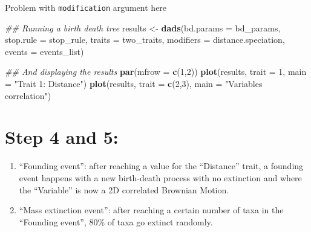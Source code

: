 \documentclass[]{book}
\newenvironment{Shaded}{\begin{snugshade}}{\end{snugshade}}
\newcommand{\CommentTok}[1]{\textcolor[rgb]{0.56,0.35,0.01}{\textit{#1}}}
\newcommand{\DataTypeTok}[1]{\textcolor[rgb]{0.13,0.29,0.53}{#1}}
\newcommand{\DecValTok}[1]{\textcolor[rgb]{0.00,0.00,0.81}{#1}}
\newcommand{\KeywordTok}[1]{\textcolor[rgb]{0.13,0.29,0.53}{\textbf{#1}}}
\newcommand{\NormalTok}[1]{#1}
\newcommand{\StringTok}[1]{\textcolor[rgb]{0.31,0.60,0.02}{#1}}
\providecommand{\tightlist}{%
  \setlength{\itemsep}{0pt}\setlength{\parskip}{0pt}}
\begin{document}
Problem with \texttt{modification} argument here

\begin{Shaded}
\begin{Highlighting}[]
\CommentTok{## Running a birth death tree }
\NormalTok{results <-}\StringTok{ }\KeywordTok{dads}\NormalTok{(}\DataTypeTok{bd.params  =}\NormalTok{ bd_params,}
                \DataTypeTok{stop.rule  =}\NormalTok{ stop_rule,}
                \DataTypeTok{traits     =}\NormalTok{ two_traits,}
                \DataTypeTok{modifiers  =}\NormalTok{ distance.speciation,}
                \DataTypeTok{events     =}\NormalTok{ events_list)}

\CommentTok{## And displaying the results}
\KeywordTok{par}\NormalTok{(}\DataTypeTok{mfrow =} \KeywordTok{c}\NormalTok{(}\DecValTok{1}\NormalTok{,}\DecValTok{2}\NormalTok{))}
\KeywordTok{plot}\NormalTok{(results, }\DataTypeTok{trait =} \DecValTok{1}\NormalTok{, }\DataTypeTok{main =} \StringTok{"Trait 1: Distance"}\NormalTok{)}
\KeywordTok{plot}\NormalTok{(results, }\DataTypeTok{trait =} \KeywordTok{c}\NormalTok{(}\DecValTok{2}\NormalTok{,}\DecValTok{3}\NormalTok{), }\DataTypeTok{main =} \StringTok{"Variables correlation"}\NormalTok{)}
\end{Highlighting}
\end{Shaded}

\hypertarget{step-4-and-5}{%
\section{Step 4 and 5:}\label{step-4-and-5}}

\begin{enumerate}
\def\labelenumi{\arabic{enumi}.}
\setcounter{enumi}{3}
\tightlist
\item
  ``Founding event'': after reaching a value for the ``Distance'' trait, a founding event happens with a new birth-death process with no extinction and where the ``Variable'' is now a 2D correlated Brownian Motion.
\item
  ``Mass extinction event'': after reaching a certain number of taxa in the ``Founding event'', 80\% of taxa go extinct randomly.
\end{enumerate}
\end{document}
